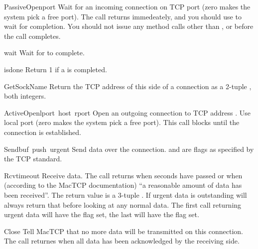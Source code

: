 \begin{funcdesc}{PassiveOpen}{port}
Wait for an incoming connection on TCP port  (zero makes the
system pick a free port). The call returns immedeately, and you should
use  to wait for completion. You should not issue any method
calls other than
,  or  before the call
completes.
\end{funcdesc}

\begin{funcdesc}{wait}{}
Wait for  to complete.
\end{funcdesc}

\begin{funcdesc}{isdone}{}
Return 1 if a  is completed.
\end{funcdesc}

\begin{funcdesc}{GetSockName}{}
Return the TCP address of this side of a connection as a 2-tuple
, both integers.
\end{funcdesc}

\begin{funcdesc}{ActiveOpen}{lport\, host\, rport}
Open an outgoing connection to TCP address . Use
local port  (zero makes the system pick a free port). This
call blocks until the connection is established.
\end{funcdesc}

\begin{funcdesc}{Send}{buf\, push\, urgent}
Send data  over the connection.  and 
are flags as specified by the TCP standard.
\end{funcdesc}

\begin{funcdesc}{Rcv}{timeout}
Receive data. The call returns when  seconds have passed
or when (according to the MacTCP documentation) ``a reasonable amount
of data has been received''. The return value is a 3-tuple
. If urgent data is outstanding 
will always return that before looking at any normal data. The first
call returning urgent data will have the  flag set, the
last will have the  flag set.
\end{funcdesc}

\begin{funcdesc}{Close}{}
Tell MacTCP that no more data will be transmitted on this
connection. The call returnes when all data has been acknowledged by
the receiving side.
\end{funcdesc}

